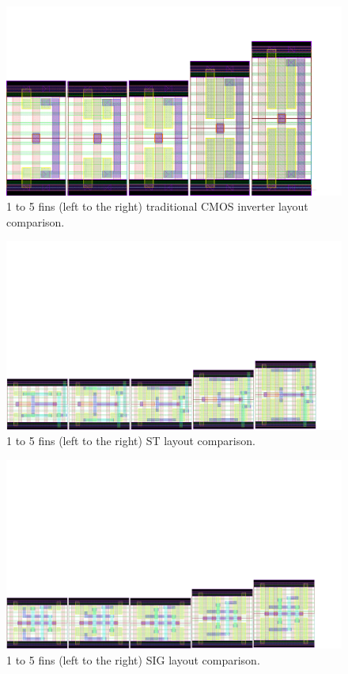 \documentclass[pgmicro,diss,english]{iiufrgs}
\begin{document}
\begin{figure}[]
\centering
\includegraphics[width=1.5\textwidth, trim={0cm 0cm 3cm 3cm},clip, angle=90]{INVComp.pdf}
\caption{1 to 5 fins (left to the right) traditional CMOS inverter layout comparison.}
\label{fig:invComp}
\end{figure}

\begin{figure}[]
\centering
\includegraphics[width=1.5\textwidth, trim={0cm 0cm 2cm 12cm},clip, angle=90]{STComp.pdf}
\caption{1 to 5 fins (left to the right) ST layout comparison.}
\label{fig:stComp}
\end{figure}

\begin{figure}[]
\centering
\includegraphics[width=1.5\textwidth, trim={0cm 0cm 2cm 12cm},clip, angle=90]{SIGComp.pdf}
\caption{1 to 5 fins (left to the right) SIG layout comparison.}
\label{fig:sigComp}
\end{figure}
\end{document}
